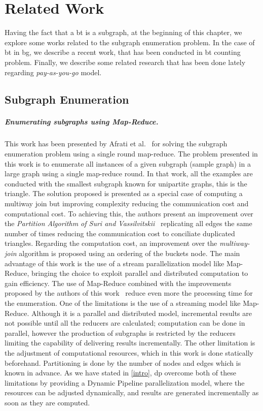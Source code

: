 \chapter{Related Work}\label{relate-work}
Having the fact that a \acrshort{bt} is a subgraph, at the beginning of this chapter, we explore some works related to the subgraph enumeration problem. 
In the case of \acrshort{bt} in \acrshort{bg}, we describe a recent work, that has been conducted in \acrshort{bt} counting problem.
Finally, we describe some related research that has been done lately regarding \emph{pay-as-you-go} model.

\section{Subgraph Enumeration}\label{sec:rel-work:subgraph}
\paragraph{Enumerating subgraphs using Map-Reduce.} This work has been presented by Afrati et al.~\cite{enumeratingsg} for solving the subgraph enumeration problem using a single round map-reduce.
The problem presented in this work is to enumerate all instances of a given subgraph (sample graph) in a large graph using a single map-reduce round. 
In that work, all the examples are conducted with the smallest subgraph known for unipartite graphs, this is the triangle.
The solution proposed is presented as a special case of computing a multiway join but improving complexity reducing the communication cost and computational cost.
To achieving this, the authors present an improvement over the \emph{Partition Algorithm of Suri and Vassilvitskii}~\cite{partitionalgo} replicating all edges the same number of times reducing the communication cost to conciliate duplicated triangles. 
Regarding the computation cost, an improvement over the \emph{multiway-join} algorithm is proposed using an ordering of the buckets node. 
The main advantage of this work is the use of a stream parallelization model like Map-Reduce, bringing the choice to exploit parallel and distributed computation to gain efficiency. 
The use of Map-Reduce combined with the improvements proposed by the authors of this work~\cite{enumeratingsg} reduce even more the processing time for the enumeration. 
One of the limitations is the use of a streaming model like Map-Reduce. Although it is a parallel and distributed model, incremental results are not possible until all the reducers are calculated; computation can be done in parallel, however the production of subgraphs is restricted by the reducers limiting the capability of delivering results incrementally. 
The other limitation is the adjustment of computational resources, which in this work is done statically beforehand. Partitioning is done by the number of nodes and edges which is known in advance.
As we have stated in \autoref{intro}, \acrshort{dp} overcome both of these limitations by providing a Dynamic Pipeline parallelization model, where the resources can be adjusted dynamically, and results are generated incrementally as soon as they are computed. 


